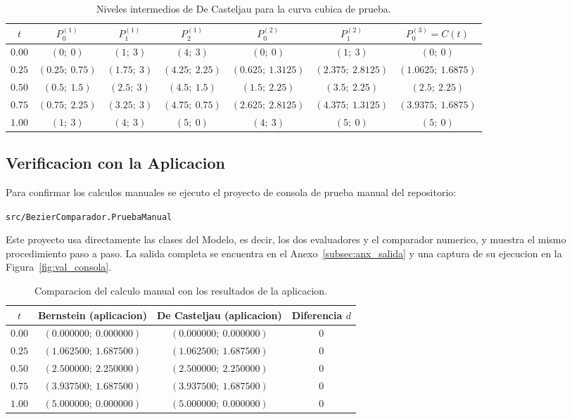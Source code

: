 \begin{table}[H]
\centering
\caption{Niveles intermedios de De Casteljau para la curva cubica de prueba.}
\label{tab:val_niveles}
\small
\setlength{\tabcolsep}{4pt}
\begin{tabular}{c ccc cc c}
\toprule
\textbf{$t$} & \textbf{$P_0^{(1)}$} & \textbf{$P_1^{(1)}$} & \textbf{$P_2^{(1)}$} & \textbf{$P_0^{(2)}$} & \textbf{$P_1^{(2)}$} & \textbf{$P_0^{(3)} = C(t)$} \\
\midrule
$0.00$ & $(0;\ 0)$ & $(1;\ 3)$ & $(4;\ 3)$ & $(0;\ 0)$ & $(1;\ 3)$ & $(0;\ 0)$ \\
$0.25$ & $(0.25;\ 0.75)$ & $(1.75;\ 3)$ & $(4.25;\ 2.25)$ & $(0.625;\ 1.3125)$ & $(2.375;\ 2.8125)$ & $(1.0625;\ 1.6875)$ \\
$0.50$ & $(0.5;\ 1.5)$ & $(2.5;\ 3)$ & $(4.5;\ 1.5)$ & $(1.5;\ 2.25)$ & $(3.5;\ 2.25)$ & $(2.5;\ 2.25)$ \\
$0.75$ & $(0.75;\ 2.25)$ & $(3.25;\ 3)$ & $(4.75;\ 0.75)$ & $(2.625;\ 2.8125)$ & $(4.375;\ 1.3125)$ & $(3.9375;\ 1.6875)$ \\
$1.00$ & $(1;\ 3)$ & $(4;\ 3)$ & $(5;\ 0)$ & $(4;\ 3)$ & $(5;\ 0)$ & $(5;\ 0)$ \\
\bottomrule
\end{tabular}
\end{table}

\subsection{Verificacion con la Aplicacion}
\label{subsec:val_verificacion}

Para confirmar los calculos manuales se ejecuto el proyecto de consola de prueba manual del repositorio:
\begin{center}
\texttt{src/BezierComparador.PruebaManual}
\end{center}
Este proyecto usa directamente las clases del Modelo, es decir, los dos evaluadores y el comparador numerico, y muestra el mismo procedimiento paso a paso. La salida completa se encuentra en el Anexo~\ref{subsec:anx_salida} y una captura de su ejecucion en la Figura~\ref{fig:val_consola}.

\begin{table}[H]
\centering
\caption{Comparacion del calculo manual con los resultados de la aplicacion.}
\label{tab:val_comparacion}
\begin{tabular}{c cc c}
\toprule
\textbf{$t$} & \textbf{Bernstein (aplicacion)} & \textbf{De Casteljau (aplicacion)} & \textbf{Diferencia $d$} \\
\midrule
$0.00$ & $(0.000000;\ 0.000000)$ & $(0.000000;\ 0.000000)$ & $0$ \\
$0.25$ & $(1.062500;\ 1.687500)$ & $(1.062500;\ 1.687500)$ & $0$ \\
$0.50$ & $(2.500000;\ 2.250000)$ & $(2.500000;\ 2.250000)$ & $0$ \\
$0.75$ & $(3.937500;\ 1.687500)$ & $(3.937500;\ 1.687500)$ & $0$ \\
$1.00$ & $(5.000000;\ 0.000000)$ & $(5.000000;\ 0.000000)$ & $0$ \\
\bottomrule
\end{tabular}
\end{table}

